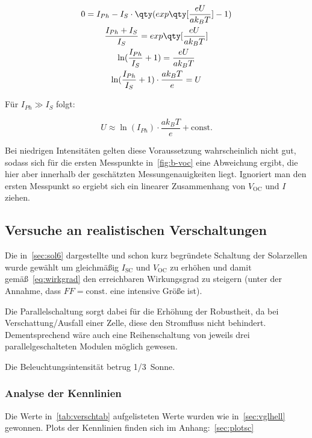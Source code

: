 \documentclass[slug=SZ, room=Hermann-Krone-Bau\,\ Labor\ 1.25,
supervisor=Martin\ Kroll, coursedate=14.\ 11.\ 2019]{../../Lab_Report_LaTeX/lab_report}
\newcommand{\sun}[1]{\SI{#1}{Sonne}}
\newcommand{\voc}{V_{\text{OC}}}
\newcommand{\isc}{I_{\text{SC}}}
\begin{document}
\begin{gather}
0  = I_{Ph} - I_S \cdot \qty(exp\qty[\frac{eU}{ak_BT}]-1)\\
\frac{I_{Ph}+I_S}{I_S} = exp\qty[\frac{eU}{ak_BT}]\\
\ln(\frac{I_{Ph}}{I_S}+1) = \frac{eU}{ak_BT}\\
\ln(\frac{I_{Ph}}{I_S}+1) \cdot \frac{ak_BT}{e} = U \label{eq:shocknachu}
\end{gather}

Für \(I_{Ph} \gg I_S\) folgt:

\begin{equation}\label{eq:iphgross}
          U \approx \ln(I_{Ph}) \cdot \frac{ak_BT}{e} + \text{const.}
\end{equation}

Bei niedrigen Intensit\"aten gelten diese Voraussetzung wahrscheinlich
nicht gut, sodass sich f\"ur die ersten Messpunkte in~\ref{fig:b-voc}
eine Abweichung ergibt, die hier aber innerhalb der gesch\"atzten
Messungenauigkeiten liegt. Ignoriert man den ersten Messpunkt so
ergiebt sich ein linearer Zusammenhang von \(\voc\) und \(I\) ziehen.

\subsection{Versuche an realistischen Verschaltungen}
\label{sec:auswc}
Die in~\ref{sec:sol6} dargestellte und schon kurz begr\"undete
Schaltung der Solarzellen wurde gew\"ahlt um gleichm\"a\ss{}ig
\(\isc\) und \(\voc\) zu erh\"ohen und damit
gem\"a\ss{}~\eqref{eq:wirkgrad} den erreichbaren Wirkungsgrad zu steigern (unter der
Annahme, dass \(FF=\text{const.}\) eine intensive Gr\"o\ss{}e ist).

Die Parallelschaltung sorgt dabei f\"ur die Erh\"ohung der Robustheit,
da bei Verschattung/Ausfall einer Zelle, diese den Stromfluss nicht
behindert. Dementsprechend w\"are auch eine Reihenschaltung von
jeweils drei parallelgeschalteten Modulen m\"oglich gewesen.

Die Beleuchtungsintensität betrug \sun{1/3}.

\subsubsection{Analyse der Kennlinien}

Die Werte in~\ref{tab:verschtab} aufgelisteten Werte wurden wie
in~\ref{sec:vglhell} gewonnen.
Plots der Kennlinien finden sich im Anhang:~\ref{sec:plotsc}
\end{document}
